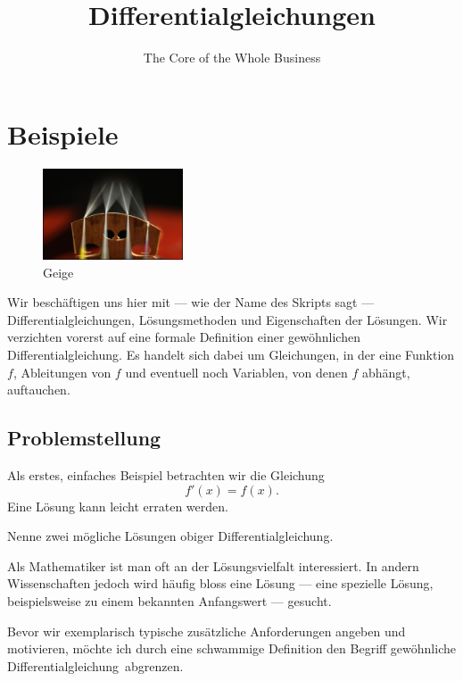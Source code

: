 \documentclass[%
draft,
11pt,%
twoside,%
titlepage,%
german,%
headsepline%
]{scrartcl}
\title{Differentialgleichungen}
\subtitle{The Core of the Whole Business}
\author{}
\date{}
\begin{document}
\maketitle
\tableofcontents
\cleardoublepage

\section{Beispiele}

\begin{figure}
\vspace{-0pt}
  \begin{center}
    \includegraphics[width=0.37\textwidth]{pictures/geige}
  \end{center}
\caption{Geige}
\end{figure}
Wir besch\"aftigen uns hier mit --- wie der Name des Skripts sagt --- Differentialgleichungen, L\"osungsmethoden und Eigenschaften der L\"osungen. Wir verzichten vorerst auf eine formale Definition einer \glqq gew\"ohnlichen Differentialgleichung\grqq. Es handelt sich dabei um Gleichungen, in der eine Funktion $f$, Ableitungen von $f$ und eventuell noch Variablen, von denen $f$ abh\"angt, auftauchen.

\subsection{Problemstellung}

Als erstes, einfaches Beispiel betrachten wir die Gleichung
$$f'(x)=f(x).$$
Eine L\"osung kann leicht erraten werden.

\begin{ueb}
Nenne zwei m\"ogliche L\"osungen obiger Differentialgleichung.
\end{ueb}

Als Mathematiker ist man oft an der L\"osungsvielfalt interessiert. In andern Wissenschaften jedoch wird h\"aufig bloss eine L\"osung --- eine spezielle L\"osung, beispielsweise zu einem bekannten Anfangswert --- gesucht.

Bevor wir exemplarisch typische zus\"atzliche Anforderungen angeben und motivieren, m\"ochte ich durch eine schwammige Definition den  Begriff \glqq gew\"ohnliche Differentialgleichung\grqq\ abgrenzen.
\end{document}
